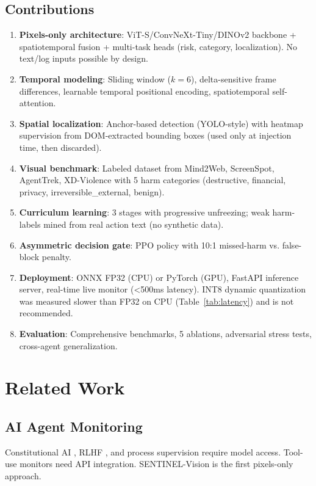 \documentclass[11pt,a4paper]{article}
\begin{document}
\subsection{Contributions}
\begin{enumerate}
    \item \textbf{Pixels-only architecture}: ViT-S/ConvNeXt-Tiny/DINOv2 backbone + spatiotemporal fusion + multi-task heads (risk, category, localization). No text/log inputs possible by design.
    \item \textbf{Temporal modeling}: Sliding window ($k=6$), delta-sensitive frame differences, learnable temporal positional encoding, spatiotemporal self-attention.
    \item \textbf{Spatial localization}: Anchor-based detection (YOLO-style) with heatmap supervision from DOM-extracted bounding boxes (used only at injection time, then discarded).
    \item \textbf{Visual benchmark}: Labeled dataset from Mind2Web, ScreenSpot, AgentTrek, XD-Violence with 5 harm categories (destructive, financial, privacy, irreversible\_external, benign).
    \item \textbf{Curriculum learning}: 3 stages with progressive unfreezing; weak harm-labels mined from real action text (no synthetic data).
    \item \textbf{Asymmetric decision gate}: PPO policy with 10:1 missed-harm vs. false-block penalty.
    \item \textbf{Deployment}: ONNX FP32 (CPU) or PyTorch (GPU), FastAPI inference server, real-time live monitor (\textless 500ms latency). INT8 dynamic quantization was measured slower than FP32 on CPU (Table~\ref{tab:latency}) and is not recommended.
    \item \textbf{Evaluation}: Comprehensive benchmarks, 5 ablations, adversarial stress tests, cross-agent generalization.
\end{enumerate}

\section{Related Work}
\subsection{AI Agent Monitoring}
Constitutional AI \cite{bai2022constitutional}, RLHF \cite{ouyang2022training}, and process supervision \cite{lightman2023let} require model access. Tool-use monitors \cite{schick2023toolformer} need API integration. SENTINEL-Vision is the first pixels-only approach.
\end{document}
